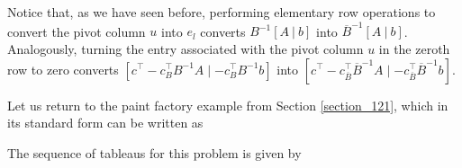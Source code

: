 Notice that, as we have seen before, performing elementary row operations to convert the pivot column $u$ into $e_l$ converts $B^{-1}[A ~|~ b]$ into $\overline{B}^{-1}[A ~|~ b]$. Analogously, turning the entry associated with the pivot column $u$ in the zeroth row to zero converts $[c^\top - c_B^\top B^{-1}A \mid -c_B^\top B^{-1}b]$ into $[c^\top - c_{\overline{B}}^\top \overline{B}^{-1}A \mid -c_{\overline{B}}^\top \overline{B}^{-1}b]$.

Let us return to the paint factory example from Section \ref{section_121}, which in its standard form can be written as
%

The sequence of tableaus for this problem is given by 

